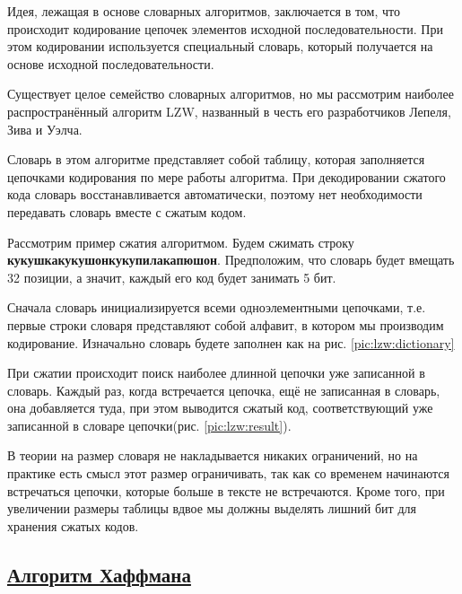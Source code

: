 Идея, лежащая в основе словарных алгоритмов, заключается в том, что происходит кодирование цепочек элементов исходной последовательности. При этом кодировании используется специальный словарь, который получается на основе исходной последовательности. 

Существует целое семейство словарных алгоритмов, но мы рассмотрим наиболее распространённый алгоритм LZW, названный в честь его разработчиков Лепеля, Зива и Уэлча. 

Словарь в этом алгоритме представляет собой таблицу, которая заполняется цепочками кодирования по мере работы алгоритма. При декодировании сжатого кода словарь восстанавливается автоматически, поэтому нет необходимости передавать словарь вместе с сжатым кодом. 

Рассмотрим пример сжатия алгоритмом. Будем сжимать строку \textbf{кукушкакукушонкукупилакапюшон}. Предположим, что словарь будет вмещать 32 позиции, а значит, каждый его код будет занимать 5 бит.

Сначала словарь инициализируется всеми одноэлементными цепочками, т.е. первые строки словаря представляют собой алфавит, в котором мы производим кодирование. Изначально словарь будете заполнен как на рис. \ref{pic:lzw:dictionary}


При сжатии происходит поиск наиболее длинной цепочки уже записанной в словарь. Каждый раз, когда встречается цепочка, ещё не записанная в словарь, она добавляется туда, при этом выводится сжатый код, соответствующий уже записанной в словаре цепочки(рис. \ref{pic:lzw:result}).


В теории на размер словаря не накладывается никаких ограничений, но на практике есть смысл этот размер ограничивать, так как со временем начинаются встречаться цепочки, которые больше в тексте не встречаются. Кроме того, при увеличении размеры таблицы вдвое мы должны выделять лишний бит для хранения сжатых кодов.
  
\subsection*{\hyperlink{toc}{Алгоритм Хаффмана}}


